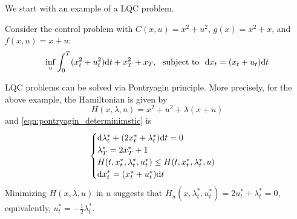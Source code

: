 \documentclass[11pt]{book}
\newcommand{\dd}{\text{\normalfont d}}
\newcommand{\dt}{\text{\normalfont d}t}
\newcommand{\dx}{\text{\normalfont d}x}
\begin{document}
We start with an example of a LQC problem. 
\begin{eg}\label{eg:lqc}
    Consider the control problem with $C(x,u)= x^2 +  u^2$, $g(x) = x^2 +  x$, and $f(x,u)=x + u$:
\begin{equation}
    \inf_{u}\int_0^T(x_t^2 + u_t^2 ){{\dt}} + x^2_T + x_T,~\text{ subject to  }~{\dx}_t=( x_t +  u_t){{\dt}}
\end{equation}
\end{eg}
LQC problems can be solved via Pontryagin principle. More precisely,  for the above example, the Hamiltonian is given by
\[
H(x,\lambda,u) = x^2 + u^2 + \lambda ( x + u)
\]
and \eqref{eqn:pontryagin_determinimstic} is 
\begin{equation}\label{eg:pontryagin_lqc}
    \begin{cases}
        {\dd}\lambda^*_t+ (2x^*_t + \lambda^*_t ){{\dt}}=0\\
        \lambda^*_T= 2x^*_T + 1\\
        H(t,x^*_t,\lambda^*_t,u^*_t)\le H(t,x^*_t,\lambda^*_t,u)\\
        {\dx}^*_t=( x^*_t + u^*_t){{\dt}}
        \end{cases}
\end{equation}
Minimizing $H(x,\lambda,u)$ in $u$ suggests that $H_u(x,\lambda^*_t,u^*_t)=2u^*_t+  \lambda^*_t =0$, equivalently, $u^*_t=-\frac{1}{2}\lambda^*_t$.
\end{document}
